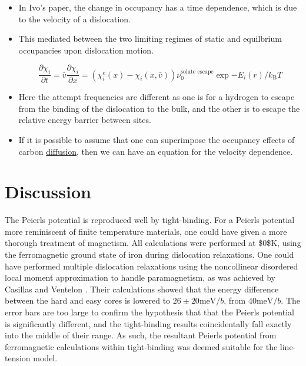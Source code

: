 \documentclass[a4paper,12pt,oneside,print,numbered,index,PageStyleIII]{PhDThesisPSnPDF}
\begin{document}
\begin{enumerate}
\begin{itemize}
\item In Ivo's paper, the change in occupancy has a time dependence,
which is due to the velocity of a dislocation.
\item This mediated between the two limiting regimes of static and
equilbrium occupancies upon dislocation motion.

\[ \frac{\partial \chi_i}{\partial t} = \bar{v}\frac{\partial
       \chi_i}{\partial x} = \left( \chi_i^e(x) - \chi_i(x,\bar{v})
       \right) \nu_0^{\text{solute escape}} \exp{ - E_i(r) / k_{\text{B}} T} \]

\item Here the attempt frequencies are different as one is for a
hydrogen to escape from the binding of the dislocation to the
bulk, and the other is to escape the relative energy barrier
between sites.

\item If it is possible to assume that one can superimpose the
occupancy effects of carbon \uline{diffusion}, then we can have an
equation for the velocity dependence.
\end{itemize}
\end{enumerate}



\section{Discussion}
\label{sec:org9c1dbd3}
\label{sec:discussion}





The Peierls potential is reproduced well by tight-binding. For a Peierls potential more
reminiscent of finite temperature materials, one could have given a more thorough treatment of
magnetism. All calculations were performed at \$0\textdegree{}\$K, using the ferromagnetic ground state of
iron during dislocation relaxations. One could have performed multiple dislocation relaxations
using the noncollinear disordered local moment approximation to handle paramagnetism, as was
achieved by Casillas and Ventelon \cite{Casillas-Trujillo2020}. Their calculations showed that the
energy difference between the hard and easy cores is lowered to \(26 \pm 20\text{meV/}b\), from
\(40 \text{meV/}b\). The error bars are too large to confirm the hypothesis that that the Peierls
potential is significantly different, and the tight-binding results coincidentally fall exactly
into the middle of their range. As such, the resultant Peierls potential from ferromagnetic
calculations within tight-binding was deemed suitable for the line-tension model.
\end{document}
